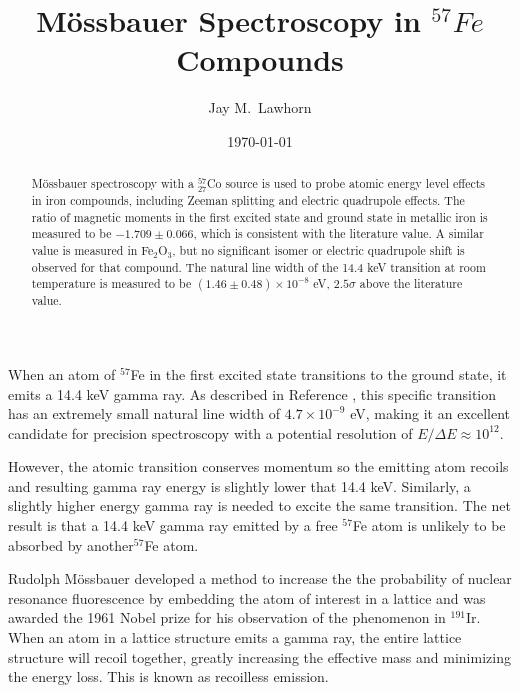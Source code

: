 \newcommand{\cd}{$\cdot$}

%
%


\title{M{\"o}ssbauer Spectroscopy in $^{57}Fe$ Compounds}
\author{Jay M.\ Lawhorn}
\date{\today}

\begin{abstract}
M{\"o}ssbauer spectroscopy with a $^{57}_{27}$Co source is used to probe atomic energy level effects in iron compounds, including Zeeman splitting and electric quadrupole effects. The ratio of magnetic moments in the first excited state and ground state in metallic iron is measured to be $-1.709\pm0.066$, which is consistent with the literature value. A similar value is measured in Fe$_2$O$_3$, but no significant isomer or electric quadrupole shift is observed for that compound. The natural line width of the 14.4 keV transition at room temperature is measured to be $(1.46\pm0.48)\times 10^{-8}$ eV, $2.5\sigma$ above the literature value.
\end{abstract}

\maketitle

When an atom of $^{57}$Fe in the first excited state transitions to the ground state, it emits a 14.4 keV gamma ray. As described in Reference \cite{lab}, this specific transition has an extremely small natural line width of $4.7\times10^{-9}$ eV, making it an excellent candidate for precision spectroscopy with a potential resolution of $E/\Delta E \approx 10^{12}$. 

However, the atomic transition conserves momentum so the emitting atom recoils and resulting gamma ray energy is slightly lower that 14.4 keV. Similarly, a slightly higher energy gamma ray is needed to excite the same transition. The net result is that a 14.4 keV gamma ray emitted by a free $^{57}$Fe atom is unlikely to be absorbed by another$^{57}$Fe atom.

Rudolph M{\"o}ssbauer developed a method to increase the the probability of nuclear resonance fluorescence by embedding the atom of interest in a lattice and was awarded the 1961 Nobel prize for his observation of the phenomenon in $^{191}$Ir. When an atom in a lattice structure emits a gamma ray, the entire lattice structure will recoil together, greatly increasing the effective mass and minimizing the energy loss. This is known as recoilless emission. 

